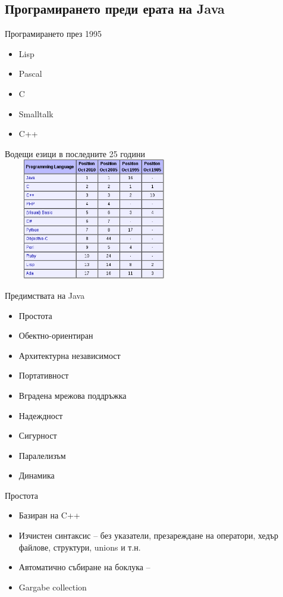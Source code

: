 \documentclass{beamer}
\begin{document}
\subsection{Програмирането преди ерата на Java}

\begin{frame}{Програмирането през 1995}
  \transdissolve
  \begin{itemize}
    \item Lisp
    \item Pascal
    \item C
    \item Smalltalk
    \item C++
  \end{itemize}
\end{frame}

\begin{frame}{Водещи езици в последните 25 години}
  \transdissolve
  \includegraphics[width=300px,
  height=200px]{images/lang-history}
\end{frame}


\begin{frame}{Предимствата на Java}
  \transdissolve
  \begin{itemize}
  \item Простота
  \item Обектно-ориентиран
  \item Архитектурна независимост
  \item Портативност
  \item Вградена мрежова поддръжка
  \item Надеждност
  \item Сигурност
  \item Паралелизъм
  \item Динамика
  \end{itemize}
\end{frame}


\begin{frame}{Простота}
  \transdissolve  
  \begin{itemize}
    \item Базиран на C++
    \item Изчистен синтаксис – без указатели,
    презареждане на оператори, хедър
    файлове, структури, unions и т.н.
    \item Автоматично събиране на боклука –
    \item Gargabe collection
    
  \end{itemize}
\end{frame}
\end{document}
